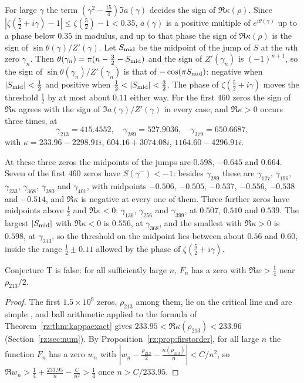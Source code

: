 For large $\gamma$ the term $(\gamma^2-\frac{15}4)\Im a(\gamma)$ decides the sign of $\Re\kappa(\rho)$. Since $|\zeta(\frac52+i\gamma)-1|\le\zeta(\frac52)-1<0.35$, $a(\gamma)$ is a positive multiple of $e^{i\theta(\gamma)}$ up to a phase below $0.35$ in modulus, and up to that phase the sign of $\Re\kappa(\rho)$ is the sign of $\sin\theta(\gamma)/Z'(\gamma)$. Let $S_{\rm mid}$ be the midpoint of the jump of $S$ at the $n$th zero $\gamma_n$. Then $\theta(\gamma_n)=\pi(n-\frac32-S_{\rm mid})$ and the sign of $Z'(\gamma_n)$ is $(-1)^{n+1}$, so the sign of $\sin\theta(\gamma_n)/Z'(\gamma_n)$ is that of $-\cos(\pi S_{\rm mid})$: negative when $|S_{\rm mid}|<\frac12$ and positive when $\frac12<|S_{\rm mid}|<\frac32$. The phase of $\zeta(\frac52+i\gamma)$ moves the threshold $\frac12$ by at most about $0.11$ either way. For the first $460$ zeros the sign of $\Re\kappa$ agrees with the sign of $\Im a(\gamma)/Z'(\gamma)$ in every case, and $\Re\kappa>0$ occurs three times, at
\[
\gamma_{213}=415.4552,\quad\gamma_{289}=527.9036,\quad\gamma_{379}=650.6687,
\]
with $\kappa=233.96-2298.91i$, $604.16+3074.08i$, $1164.60-4296.91i$.

At these three zeros the midpoints of the jumps are $0.598$, $-0.645$ and $0.664$. Seven of the first $460$ zeros have $S(\gamma^-)<-1$: besides $\gamma_{289}$ these are $\gamma_{127}$, $\gamma_{196}$, $\gamma_{233}$, $\gamma_{368}$, $\gamma_{380}$ and $\gamma_{401}$, with midpoints $-0.506$, $-0.505$, $-0.537$, $-0.556$, $-0.538$ and $-0.514$, and $\Re\kappa$ is negative at every one of them. Three further zeros have midpoints above $\frac12$ and $\Re\kappa<0$: $\gamma_{136}$, $\gamma_{256}$ and $\gamma_{399}$, at $0.507$, $0.510$ and $0.539$. The largest $|S_{\rm mid}|$ with $\Re\kappa<0$ is $0.556$, at $\gamma_{368}$, and the smallest with $\Re\kappa>0$ is $0.598$, at $\gamma_{213}$, so the threshold on the midpoint lies between about $0.56$ and $0.60$, inside the range $\frac12\pm0.11$ allowed by the phase of $\zeta(\frac52+i\gamma)$.

\begin{corollary}\label{rz:cor:Tfalse}
Conjecture T is false: for all sufficiently large $n$, $F_n$ has a zero with $\Re w>\frac14$ near $\rho_{213}/2$.
\end{corollary}

\begin{proof}
The first $1.5\times10^9$ zeros, $\rho_{213}$ among them, lie on the critical line and are simple \cite{LRW86}, and ball arithmetic applied to the formula of Theorem~\ref{rz:thm:kappaexact} gives $233.95<\Re\kappa(\rho_{213})<233.96$ (Section~\ref{rz:sec:num}). By Proposition~\ref{rz:prop:firstorder}, for all large $n$ the function $F_n$ has a zero $w_n$ with $|w_n-\frac{\rho_{213}}2-\frac{\kappa(\rho_{213})}n|<C/n^2$, so $\Re w_n>\frac14+\frac{233.95}n-\frac C{n^2}>\frac14$ once $n>C/233.95$.
\end{proof}

